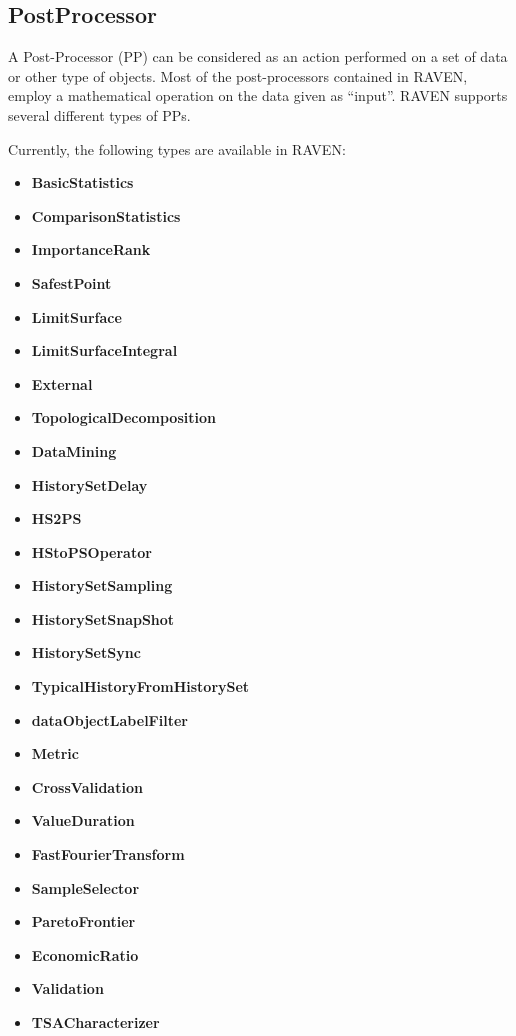 \subsection{PostProcessor}
\label{sec:models_postProcessor}
A Post-Processor (PP) can be considered as an action performed on a set of data
or other type of objects.
%
Most of the post-processors contained in RAVEN, employ a mathematical operation
on the data given as ``input''.
%
RAVEN supports several different types of PPs.

Currently, the following types are available in RAVEN:
\begin{itemize}
  \itemsep0em
  \item \textbf{BasicStatistics}
  \item \textbf{ComparisonStatistics}
  \item \textbf{ImportanceRank}
  \item \textbf{SafestPoint}
  \item \textbf{LimitSurface}
  \item \textbf{LimitSurfaceIntegral}
  \item \textbf{External}
  \item \textbf{TopologicalDecomposition}
  \item \textbf{DataMining}
  \item \textbf{HistorySetDelay}
  \item \textbf{HS2PS}
  \item \textbf{HStoPSOperator}
  \item \textbf{HistorySetSampling}
  \item \textbf{HistorySetSnapShot}
  \item \textbf{HistorySetSync}
  \item \textbf{TypicalHistoryFromHistorySet}
  \item \textbf{dataObjectLabelFilter}
  \item \textbf{Metric}
  \item \textbf{CrossValidation}
  \item \textbf{ValueDuration}
  \item \textbf{FastFourierTransform}
  \item \textbf{SampleSelector}
  \item \textbf{ParetoFrontier}
  \item \textbf{EconomicRatio}
  \item \textbf{Validation}
  \item \textbf{TSACharacterizer}
\end{itemize}

